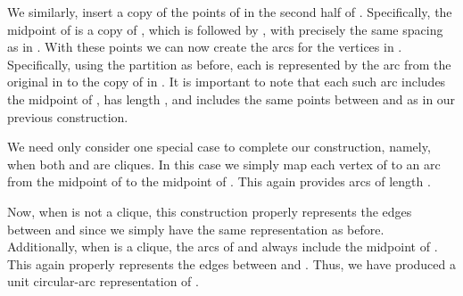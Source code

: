 \documentclass[11pt,a4paper]{article}
\newenvironment{proof}{\noindent {\it Proof:~}}{\hfill \smallskip\par}
\begin{document}
\begin{proof}
We similarly, insert a copy of the points of  in the
second half of . Specifically, the midpoint of
 is a copy of , which is followed by ,  with precisely the same spacing
as in .
With these points we can now create the arcs for the vertices
in . Specifically, using the partition 
as before, each  is represented by the arc
from the original  in  to the copy of 
in . It is important to note that each such arc
includes the midpoint of , has length ,
and includes the same points between  and  as in
our previous construction.

We need only consider one special case to complete our
construction, namely, when both  and
 are cliques. In this case we simply map
each vertex of  to an arc from the midpoint of 
to the midpoint of . This again provides arcs of length
.

Now, when  is not a clique, this construction
properly represents the edges between  and  since we
simply have the same representation as before. Additionally, when
 is a clique, the arcs of  and 
always include the midpoint of . This again properly
represents the edges between  and . Thus, we have
produced a unit circular-arc representation of .
\end{proof}
\end{document}
